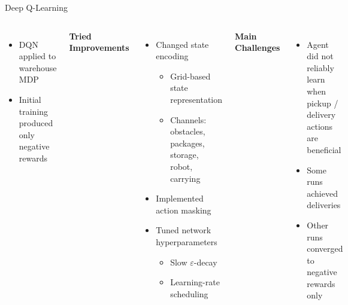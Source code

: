 \documentclass[aspectratio=169]{beamer}
\begin{document}
\begin{frame}{Deep Q-Learning}
  \begin{columns}


      \begin{itemize}
        \item DQN applied to warehouse MDP
        \item Initial training produced only negative rewards
      \end{itemize}

      \vspace{0.3cm}

      \textbf{Tried Improvements}
      \begin{itemize}
        \item Changed state encoding
          \begin{itemize}
            \item Grid-based state representation
            \item Channels: obstacles, packages, storage, robot, carrying
          \end{itemize}

        \item Implemented action masking

        \item Tuned network hyperparameters
          \begin{itemize}
            \item Slow $\varepsilon$-decay
            \item Learning-rate scheduling
          \end{itemize}
      \end{itemize}


      \textbf{Main Challenges}
      \begin{itemize}
        \item Agent did not reliably learn
              when pickup / delivery actions are beneficial

        \item Some runs achieved deliveries

        \item Other runs converged to
              negative rewards only
      \end{itemize}

  \end{columns}
\end{frame}
\end{document}
